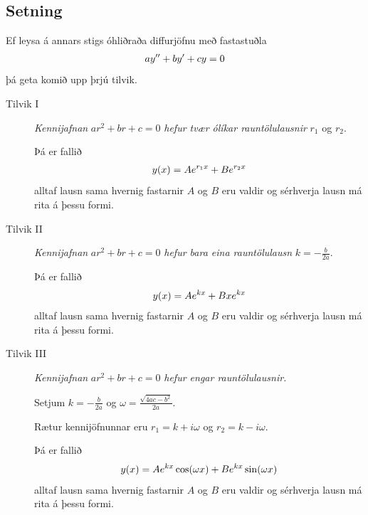 \documentclass[a4paper,10pt,icelandic]{sphinxmanual}
\begin{document}
\subsection{Setning}
\label{kafli08:stigs-ohlidrud}\label{kafli08:id3}
Ef leysa á annars stigs óhliðraða diffurjöfnu með fastastuðla
\begin{gather}
\begin{split}ay''+by'+cy=0\end{split}\notag
\end{gather}
þá geta komið upp þrjú tilvik.
\begin{description}
\item[{Tilvik I}] \leavevmode
\emph{Kennijafnan} \(ar^2+br+c=0\) \emph{hefur tvær ólíkar rauntölulausnir}
\(r_1\) og \(r_2\).

Þá er fallið
\begin{gather}
\begin{split}y(x)=Ae^{r_1x}+Be^{r_2x}\end{split}\notag
\end{gather}
alltaf lausn sama hvernig fastarnir \(A\) og \(B\) eru
valdir og sérhverja lausn má rita á þessu formi.

\item[{Tilvik II}] \leavevmode
\emph{Kennijafnan} \(ar^2+br+c=0\) \emph{hefur bara eina rauntölulausn}
\(k=-\frac{b}{2a}\).

Þá er fallið
\begin{gather}
\begin{split}y(x)=Ae^{kx}+Bxe^{kx}\end{split}\notag
\end{gather}
alltaf lausn sama hvernig fastarnir \(A\) og \(B\) eru
valdir og sérhverja lausn má rita á þessu formi.

\item[{Tilvik III}] \leavevmode
\emph{Kennijafnan} \(ar^2+br+c=0\) \emph{hefur engar rauntölulausnir.}

Setjum \(k=-\frac{b}{2a}\) og
\(\omega=\frac{\sqrt{4ac-b^2}}{2a}\).

Rætur kennijöfnunnar eru \(r_1=k+i\omega\) og
\(r_2=k-i\omega\).

Þá er fallið
\begin{gather}
\begin{split}y(x)=Ae^{kx}\cos(\omega x)+Be^{kx}\sin(\omega x)\end{split}\notag
\end{gather}
alltaf lausn sama hvernig fastarnir \(A\) og \(B\) eru
valdir og sérhverja lausn má rita á þessu formi.

\end{description}
\end{document}
